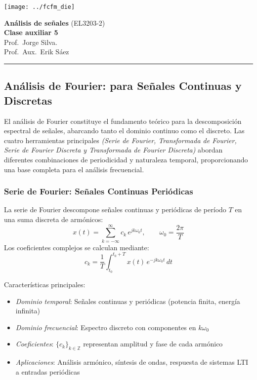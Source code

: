 \documentclass[
  11pt,
  letterpaper,
   addpoints,
   answers
  ]{exam}
\begin{document}
\noindent
\begin{minipage}{0.47\textwidth}
\texttt{[image: ../fcfm\_die]}
\end{minipage}
\begin{minipage}{0.53\textwidth}
\begin{center} 
\large\textbf{Análisis de señales} (EL3203-2) \\
\large\textbf{Clase auxiliar 5} \\
\normalsize Prof.~Jorge Silva.\\
\normalsize Prof.~Aux.~Erik Sáez
\end{center}
\end{minipage}
 
\vspace{0.5cm}
\noindent
\vspace{.85cm}
\noindent\rule{\textwidth}{0.4pt}
\subsection*{Análisis de Fourier: para Señales Continuas y Discretas}

El análisis de Fourier constituye el fundamento teórico para la descomposición espectral de señales, abarcando tanto el dominio continuo como el discreto. Las cuatro herramientas principales \textit{(Serie de Fourier, Transformada de Fourier, Serie de Fourier Discreta y Transformada de Fourier Discreta)} abordan diferentes combinaciones de periodicidad y naturaleza temporal, proporcionando una base completa para el análisis frecuencial.

\subsubsection*{Serie de Fourier: Señales Continuas Periódicas}
La serie de Fourier descompone señales continuas y periódicas de período \(T\) en una suma discreta de armónicos:
\begin{equation}
x(t) = \sum_{k=-\infty}^{\infty} c_k\,e^{jk\omega_0 t}, \qquad \omega_0 = \frac{2\pi}{T}
\end{equation}
Los coeficientes complejos se calculan mediante:
\begin{equation}
c_k = \frac{1}{T}\int_{t_0}^{t_0+T} x(t)\,e^{-jk\omega_0 t}\,dt
\end{equation}

Características principales:
\begin{itemize}
\item \textit{Dominio temporal}: Señales continuas y periódicas (potencia finita, energía infinita)
\item \textit{Dominio frecuencial}: Espectro discreto con componentes en \(k\omega_0\)
\item \textit{Coeficientes}: \(\{c_k\}_{k \in \mathbb{Z}}\) representan amplitud y fase de cada armónico
\item \textit{Aplicaciones}: Análisis armónico, síntesis de ondas, respuesta de sistemas LTI a entradas periódicas
\end{itemize}
\end{document}
